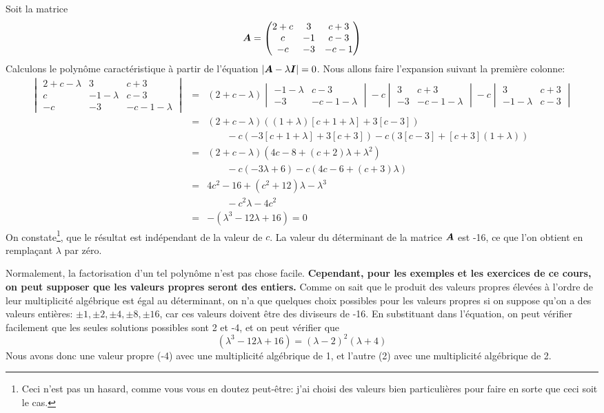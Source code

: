 Soit la matrice
\[
\boldsymbol{A} = \begin{pmatrix}
2+c & 3 & c+3 \\
c & -1 & c-3 \\
-c & -3 & -c-1
\end{pmatrix}
\]
Calculons le polynôme caractéristique
à partir de l'équation $|\boldsymbol{A}-\lambda\boldsymbol{I}| = 0$.  Nous allons faire l'expansion suivant
la première colonne:
\begin{eqnarray*}
\begin{vmatrix}
2+c-\lambda & 3 & c+3 \\
c & -1-\lambda & c-3 \\
-c & -3 & -c-1-\lambda
\end{vmatrix} &=&
(2+c-\lambda)\begin{vmatrix}
-1-\lambda & c-3 \\
-3 & -c-1-\lambda
\end{vmatrix}
-c \begin{vmatrix}
3 & c+3 \\
-3 & -c-1-\lambda
\end{vmatrix}
-c \begin{vmatrix}
3 & c+3 \\
-1-\lambda & c-3
\end{vmatrix} \\
&=& (2+c-\lambda)((1+\lambda)[c+1+\lambda]+3[c-3]) \\
&&\qquad -c(-3[c+1+\lambda] + 3[c+3]) -c(3[c-3]+ [c+3](1+\lambda)) \\
%
&=& (2+c-\lambda)(4c-8 + (c+2)\lambda + \lambda^2) \\
&&\qquad -c(-3\lambda + 6) -c(4c -6 + (c+3)\lambda)\\
%
&=& 4c^2-16 + (c^2 + 12)\lambda - \lambda^3 \\
&&\qquad -c^2\lambda - 4c^2\\
%
&=& -(\lambda^3 -12\lambda + 16) = 0
\end{eqnarray*}
On constate\footnote{Ceci n'est pas un hasard, comme vous vous en doutez peut-être: j'ai
choisi des valeurs bien particulières pour faire en sorte que ceci soit le cas.}, que le résultat est indépendant de la valeur de $c$.  La valeur du déterminant de la matrice $\boldsymbol{A}$ est -16, ce que l'on obtient en remplaçant $\lambda$ par zéro.

Normalement, la factorisation d'un tel polynôme n'est pas chose facile.  
\textbf{Cependant, pour les exemples et les exercices de ce cours, 
on peut supposer que les valeurs propres seront des entiers.}
Comme on sait que le produit des valeurs propres élevées à l'ordre de leur 
multiplicité algébrique est égal au déterminant, on
n'a que quelques choix possibles pour les valeurs propres si on suppose qu'on a des
valeurs entières: $\pm 1, \pm 2, \pm 4, \pm 8, \pm 16$, car ces valeurs doivent être des
diviseurs de -16.  En substituant dans l'équation, on peut vérifier facilement que les seules
solutions possibles sont 2 et -4, et on peut vérifier que
\[
(\lambda^3 -12\lambda + 16) = (\lambda -2)^2 (\lambda+4)
\]
Nous avons donc une valeur propre (-4) avec une multiplicité algébrique de 1, et l'autre (2)
avec une multiplicité algébrique de 2.

